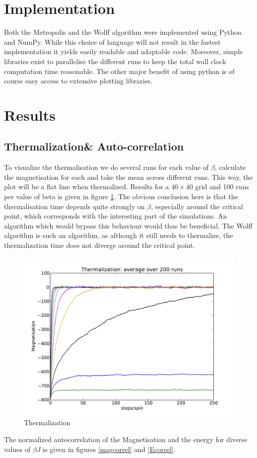 \documentclass[11pt,twocolumn]{article}
\begin{document}
\section{Implementation}
Both the Metropolis and the Wolff algorithm were implemented using Python and NumPy. While this choice of language will not result in the fastest implementation it yields easily readable and adaptable code. 
Moreover, simple libraries exist to parallelise the different runs to keep the total wall clock computation time reasonable.
The other major benefit of using python is of course easy access to extensive plotting libraries.
\section{Results}
\subsection{Thermalization\& Auto-correlation}
To visualize the thermalisation we do several runs for each value of $\beta$, calculate the magnetisation for each and take the mean across different runs. This way, the plot will be a flat line when thermalized. Results for a $40\times40$ grid and 100 runs per value of beta is given in figure \ref{therm}. The obvious conclusion here is that the thermalisation time depends quite strongly on $\beta$, especially around the critical point, which corresponds with the interesting part of the simulations. An algorithm which would bypass this behaviour would thus be beneficial. The Wolff algorithm is such an algorithm, as although it still needs to thermalize, the thermalization time does not diverge around the critical point.
\begin{figure}[!ht]
\centering \includegraphics[width=\columnwidth]{figs/therm.pdf}
\caption{Thermalization}
\label{therm}
\end{figure}
The normalized autocorrelation of the Magnetisation and the energy for diverse values of $\beta J$ is given in figures \ref{magcorrel} and \ref{Ecorrel}.
\end{document}
